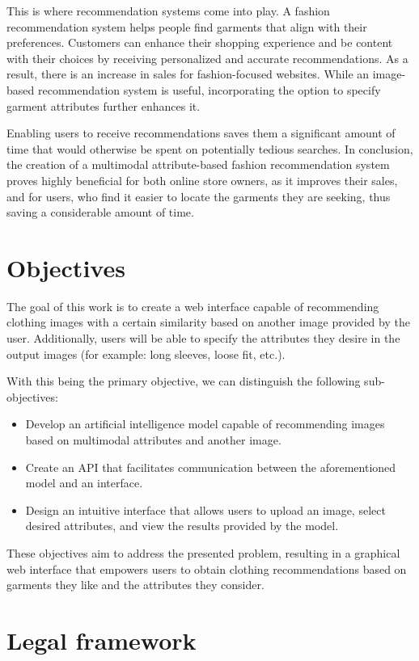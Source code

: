 \documentclass[12pt]{report} %
\begin{document}
This is where recommendation systems come into play. A fashion recommendation system helps people find garments that align with their preferences. Customers can enhance their shopping experience and be content with their choices by receiving personalized and accurate recommendations. As a result, there is an increase in sales for fashion-focused websites. While an image-based recommendation system is useful, incorporating the option to specify garment attributes further enhances it.

Enabling users to receive recommendations saves them a significant amount of time that would otherwise be spent on potentially tedious searches. In conclusion, the creation of a multimodal attribute-based fashion recommendation system proves highly beneficial for both online store owners, as it improves their sales, and for users, who find it easier to locate the garments they are seeking, thus saving a considerable amount of time.
\section*{Objectives}

The goal of this work is to create a web interface capable of recommending clothing images with a certain similarity based on another image provided by the user. Additionally, users will be able to specify the attributes they desire in the output images (for example: long sleeves, loose fit, etc.).

With this being the primary objective, we can distinguish the following sub-objectives:
\begin{itemize}
	\item Develop an artificial intelligence model capable of recommending images based on multimodal attributes and another image.
	\item Create an API that facilitates communication between the aforementioned model and an interface.
	\item Design an intuitive interface that allows users to upload an image, select desired attributes, and view the results provided by the model.
\end{itemize}

These objectives aim to address the presented problem, resulting in a graphical web interface that empowers users to obtain clothing recommendations based on garments they like and the attributes they consider.

\section*{ Legal framework}
\end{document}
